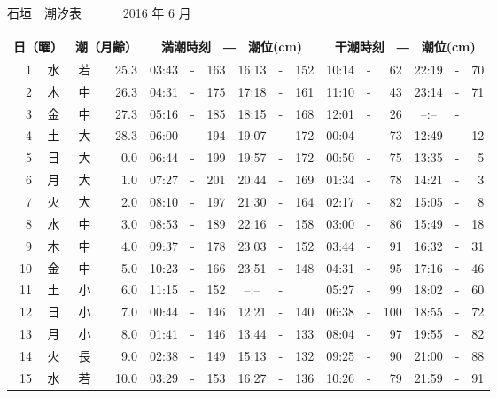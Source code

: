 \documentclass[12pt.a4j]{jsarticle}
\begin{document}
\begin{center}
\begin{table}[ht]
\begin{tabular}{|rc|cr|ccrccr|ccrccr|}
   \hline
   \end{tabular}
\end{table}
\newpage
 {\LARGE 石垣　潮汐表　　　}
 {\large 2016 年  6 月}\\
 \begin{table}[ht]
    \begin{tabular}{|rc|cr|ccrccr|ccrccr|}
    \hline
    \multicolumn{2}{|c|}{日（曜）} & \multicolumn{2}{c|}{潮（月齢）} & \multicolumn{6}{c|}{満潮時刻　―　潮位(cm)} & \multicolumn{6}{c|}{干潮時刻　―　潮位(cm)} \\
 \hline
 1 & 水 & 若 & 25.3 &  03:43 &-& 163  &  16:13 &-& 152  &   10:14 &-&  62  &   22:19 &-&  70  \\
 2 & 木 & 中 & 26.3 &  04:31 &-& 175  &  17:18 &-& 161  &   11:10 &-&  43  &   23:14 &-&  71  \\
 3 & 金 & 中 & 27.3 &  05:16 &-& 185  &  18:15 &-& 168  &   12:01 &-&  26  &   --:-- &-&     \\
 4 & 土 & 大 & 28.3 &  06:00 &-& 194  &  19:07 &-& 172  &   00:04 &-&  73  &   12:49 &-&  12  \\
 5 & 日 & 大 &  0.0 &  06:44 &-& 199  &  19:57 &-& 172  &   00:50 &-&  75  &   13:35 &-&   5  \\
 6 & 月 & 大 &  1.0 &  07:27 &-& 201  &  20:44 &-& 169  &   01:34 &-&  78  &   14:21 &-&   3  \\
 7 & 火 & 大 &  2.0 &  08:10 &-& 197  &  21:30 &-& 164  &   02:17 &-&  82  &   15:05 &-&   8  \\
 8 & 水 & 中 &  3.0 &  08:53 &-& 189  &  22:16 &-& 158  &   03:00 &-&  86  &   15:49 &-&  18  \\
 9 & 木 & 中 &  4.0 &  09:37 &-& 178  &  23:03 &-& 152  &   03:44 &-&  91  &   16:32 &-&  31  \\
10 & 金 & 中 &  5.0 &  10:23 &-& 166  &  23:51 &-& 148  &   04:31 &-&  95  &   17:16 &-&  46  \\
11 & 土 & 小 &  6.0 &  11:15 &-& 152  &  --:-- &-&     &   05:27 &-&  99  &   18:02 &-&  60  \\
12 & 日 & 小 &  7.0 &  00:44 &-& 146  &  12:21 &-& 140  &   06:38 &-& 100  &   18:55 &-&  72  \\
13 & 月 & 小 &  8.0 &  01:41 &-& 146  &  13:44 &-& 133  &   08:04 &-&  97  &   19:55 &-&  82  \\
14 & 火 & 長 &  9.0 &  02:38 &-& 149  &  15:13 &-& 132  &   09:25 &-&  90  &   21:00 &-&  88  \\
15 & 水 & 若 & 10.0 &  03:29 &-& 153  &  16:27 &-& 136  &   10:26 &-&  79  &   21:59 &-&  91  \\

\end{tabular}
\end{table}
\end{center}
\end{document}
